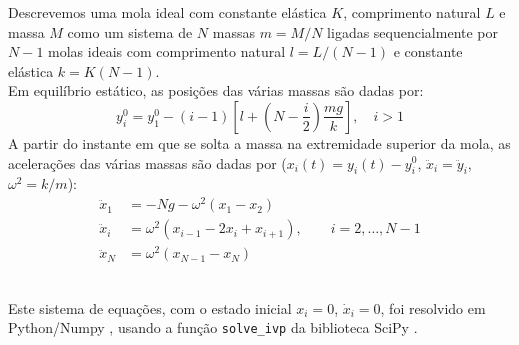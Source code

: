 \begin{minipage}{0.7\colwidth}
Descrevemos uma mola ideal com constante elástica $K$, comprimento natural $L$ e massa $M$ como um sistema de $N$ massas $m=M/N$ ligadas sequencialmente por $N-1$ molas ideais com comprimento natural $l=L/(N-1)$ e constante elástica $k=K(N-1)$.\\[1ex]   
Em equilíbrio estático, as posições das várias massas são dadas por:
\begin{equation*}
  y_i^0=y_1^0-(i-1)\left[l+\left(N-\frac{i}{2}\right)\frac{mg}{k}\right],
  \quad i>1
\end{equation*}
A partir do instante em que se solta a massa na extremidade superior da mola, as acelerações das várias massas são dadas por ($x_i(t)=y_i(t)-y_i^0$, $\ddot x_i=\ddot y_i$, $\omega^2=k/m$):
  \begin{align*}
    \ddot x_1 &=-Ng-\omega^2(x_1-x_2)\\
    \ddot x_i &= \omega^2(x_{i-1}-2x_i+x_{i+1}),\qquad i=2, \ldots, N-1\\
    \ddot x_{N} &=\omega^2(x_{N-1}-x_{N})
  \end{align*}
\end{minipage}\\[1cm]
Este sistema de equações, com o estado inicial $x_i=0$, $\dot x_i=0$, foi resolvido em Python/Numpy \cite{harris2020array}, usando a função
\texttt{solve\_ivp} da biblioteca SciPy \cite{2020SciPy-NMeth}.
